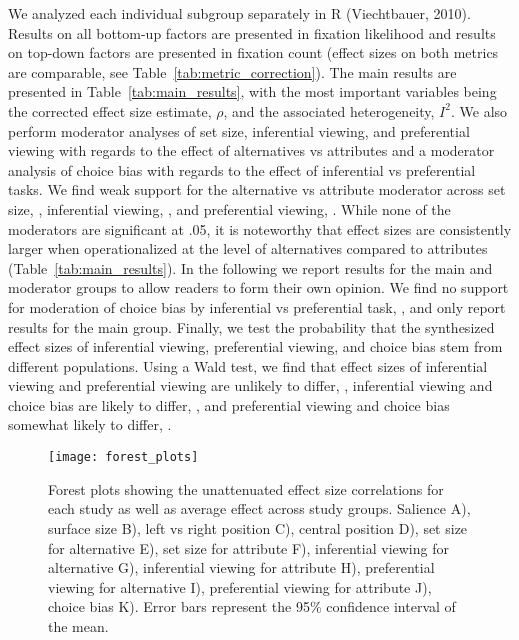 \documentclass{article}
\begin{document}
We analyzed each individual subgroup separately in R (Viechtbauer, 2010). Results on all bottom-up factors are presented in fixation likelihood and results on top-down factors are presented in fixation count (effect sizes on both metrics are comparable, see Table~\ref{tab:metric_correction}). The main results are presented in Table~\ref{tab:main_results}, with the most important variables being the corrected effect size estimate, $\rho$, and the associated heterogeneity, $I^2$. We also perform moderator analyses of set size, inferential viewing, and preferential viewing with regards to the effect of alternatives vs attributes and a moderator analysis of choice bias with regards to the effect of inferential vs preferential tasks. We find weak support for the alternative vs attribute moderator across set size, , inferential viewing, , and preferential viewing, . While none of the moderators are significant at .05, it is noteworthy that effect sizes are consistently larger when operationalized at the level of alternatives compared to attributes (Table~\ref{tab:main_results}). In the following we report results for the main and moderator groups to allow readers to form their own opinion. We find no support for moderation of choice bias by inferential vs preferential task, , and only report results for the main group. Finally, we test the probability that the synthesized effect sizes of inferential viewing, preferential viewing, and choice bias stem from different populations. Using a Wald test, we find that effect sizes of inferential viewing and preferential viewing are unlikely to differ, , inferential viewing and choice bias are likely to differ, , and preferential viewing and choice bias somewhat likely to differ, .





\begin{figure}%
\texttt{[image: forest\_plots]}
\centering
\caption{Forest plots showing the unattenuated effect size correlations for each study as well as average effect across study groups. Salience A), surface size B), left vs right position C), central position D), set size for alternative E), set size for attribute F), inferential viewing for alternative G), inferential viewing for attribute H), preferential viewing for alternative I), preferential viewing for attribute J), choice bias K). Error bars represent the 95\% confidence interval of the mean.}
\label{fig:forest_plots}
\end{figure}
\end{document}
